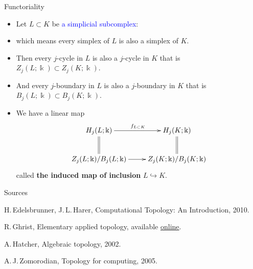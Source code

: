 \documentclass[10pt]{beamer}
\newcommand{\ko}{\Bbbk}
\begin{document}
\begin{frame}{Functoriality}

\begin{itemize}
  \item Let $L\subset K$ be \textcolor{blue}{a simplicial subcomplex}:
  \item which means every simplex of $L$ is also a simplex of $K$.\pause
  \item Then every $j$-cycle in $L$ is also a $j$-cycle in $K$ that is $Z_j(L;\ko)\subset Z_j(K;\ko)$.
  \item And every $j$-boundary in $L$ is also a $j$-boundary in $K$ that is $B_j(L;\ko)\subset B_j(K;\ko)$.\pause
  \item We have a linear map
  \[
  \xymatrix{
  H_j(L;\ko) \ar@{=}[d] \ar@{->}[r]^{f_{L\subset K}} & H_j(K;\ko) \ar@{=}[d]  \\
  Z_j(L;\ko)/B_j(L;\ko) \ar@{->}[r] & Z_j(K;\ko)/B_j(K;\ko)
  }
  \]
  called \textbf{the induced map of inclusion} $L\hookrightarrow K$.
\end{itemize}

\end{frame}





\begin{frame}{Sources}

\begin{thebibliography}{12}

 H.\,Edelsbrunner, J.\,L.\,Harer, Computational Topology: An Introduction, 2010.

 R.\,Ghrist, Elementary applied topology, available \href{https://www2.math.upenn.edu/~ghrist/notes.html}{online}.

 A.\,Hatcher, Algebraic topology, 2002.

 A.\,J.\,Zomorodian, Topology for computing, 2005.

\end{thebibliography}

\end{frame}



%
%
\end{document}
